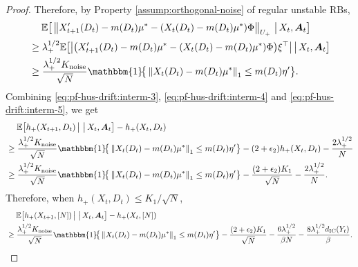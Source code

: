 \documentclass[11pt,letterpaper]{article}
\theoremstyle{plain}
\theoremstyle{definition}
\theoremstyle{remark}
\newcommand{\norm}[1]{\left\lVert#1\right\rVert}
\newcommand{\Ebig}[1]{\mathbb{E}\big[#1\big]}
\newcommand{\givenbig}{\,\big|\,}
\newcommand{\indibracbig}[1]{\mathbbm{1}\!\big\{#1\big\}}
\newcommand{\absbig}[1]{\big\lvert#1\big\rvert}
\newcommand{\ve}[1]{\bm{#1}}
\newcommand{\veA}{\ve{A}}
\newcommand{\statdist}{\mu^*}
\newcommand{\disy}{d_{\textup{IC}}}
\newcommand{\gapusmax}{\epsilon_2}
\newcommand{\radiusus}{\eta'}
\newcommand{\noiseortho}{K_{\textup{noise}}}
\newcommand{\subus}{+}%
\newcommand{\Uus}{U_{\subus}}
\newcommand{\hus}{h_{\subus}}
\newcommand{\lamus}{\lambda_{\subus}}
\begin{document}
\begin{proof}
    Therefore, by Property \ref{assump:orthogonal-noise} of regular unstable RBs,
    \begin{align}
        \nonumber
        &\mspace{23mu} \Ebig{\norm{X_{t+1}'(D_t) - m(D_t) \statdist - (X_t(D_t) - m(D_t)\statdist)\Phi}_{\Uus}  \givenbig X_t, \veA_t} \\
        \nonumber
        &\geq \lamus^{1/2} \Ebig{\absbig{\big(X_{t+1}'(D_t) - m(D_t) \statdist - (X_t(D_t) - m(D_t)\statdist)\Phi\big)\xi^\top}  \givenbig X_t, \veA_t} \\
        \label{eq:pf-hus-drift:interm-5}
        &\geq \frac{\lamus^{1/2}\noiseortho}{\sqrt{N}} \indibracbig{\norm{X_t(D_t) - m(D_t)\statdist}_1 \leq m(D_t) \radiusus}.
    \end{align}
    Combining  \eqref{eq:pf-hus-drift:interm-3},  \eqref{eq:pf-hus-drift:interm-4} and \eqref{eq:pf-hus-drift:interm-5}, we get 
    \begin{align}
        \nonumber
        &\mspace{23mu} \Ebig{\hus(X_{t+1}, D_t) \givenbig \givenbig X_t, \veA_t} - \hus(X_t, D_t)  \\
        \nonumber
        &\geq \frac{\lamus^{1/2}\noiseortho}{\sqrt{N}} \indibracbig{\norm{X_t(D_t) - m(D_t)\statdist}_1 \leq m(D_t) \radiusus} -  (2+\gapusmax)\hus(X_t, D_t) - \frac{2\lamus^{1/2}}{N} \\
        \nonumber
        &\geq \frac{\lamus^{1/2}\noiseortho}{\sqrt{N}} \indibracbig{\norm{X_t(D_t) - m(D_t)\statdist}_1 \leq m(D_t) \radiusus} -  \frac{(2+\gapusmax)K_1}{\sqrt{N}} - \frac{2\lamus^{1/2}}{N}.
    \end{align}
    Therefore, when $\hus(X_t, D_t) \leq K_1 / \sqrt{N}$,
    \begin{align}
        \nonumber
         &\mspace{23mu} \Ebig{\hus(X_{t+1}, [N]) \givenbig \givenbig X_t, \veA_t} - \hus(X_t, [N]) \\
         \label{eq:pf-hus-drift:goal-2}
         &\geq \frac{\lamus^{1/2}\noiseortho}{\sqrt{N}} \indibracbig{\norm{X_t(D_t) - m(D_t)\statdist}_1 \leq m(D_t) \radiusus} -  \frac{(2+\gapusmax)K_1}{\sqrt{N}} - \frac{6\lamus^{1/2}}{\beta N} - \frac{8 \lamus^{1/2} \disy(Y_t)}{\beta}.
    \end{align}


\end{proof}
\end{document}
